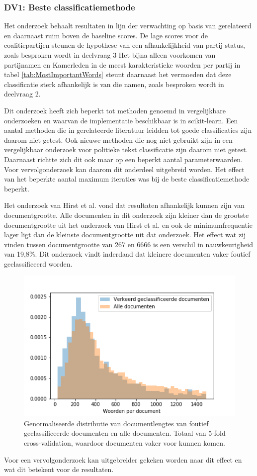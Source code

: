 \subsubsection{DV1: Beste classificatiemethode}
Het onderzoek behaalt resultaten in lijn der verwachting op basis van gerelateerd en daarnaast ruim boven de baseline scores. De lage scores voor de coalitiepartijen steunen de hypothese van een afhankelijkheid van partij-status, zoals besproken wordt in deelvraag 3 Het bijna alleen voorkomen van partijnamen en Kamerleden in de meest karakteristieke woorden per partij in tabel \ref{tab:MostImportantWords} steunt daarnaast het vermoeden dat deze classificatie sterk afhankelijk is van die namen, zoals besproken wordt in deelvraag 2.  \par
Dit onderzoek heeft zich beperkt tot methoden genoemd in vergelijkbare onderzoeken en waarvan de implementatie beschikbaar is in scikit-learn. Een aantal methoden die in gerelateerde literatuur leidden tot goede classificaties zijn daarom niet getest. Ook nieuwe methoden die nog niet gebruikt zijn in een vergelijkbaar onderzoek voor politieke tekst classificatie zijn daarom niet getest. Daarnaast richtte zich dit ook maar op een beperkt aantal parameterwaarden. Voor vervolgonderzoek kan daarom dit onderdeel uitgebreid worden. Het effect van het beperkte aantal maximum iteraties was bij de beste classificatiemethode beperkt.\par
Het onderzoek van Hirst et al. vond dat resultaten afhankelijk kunnen zijn van documentgrootte. Alle documenten in dit onderzoek zijn kleiner dan de grootste documentgrootte uit het onderzoek van Hirst et al. en ook de minimumfrequentie lager ligt dan de kleinste documentgrootte uit dat onderzoek.
Het effect wat zij vinden tussen documentgrootte van 267 en 6666 is een verschil in nauwkeurigheid van 19,8\%. Dit onderzoek vindt inderdaad dat kleinere documenten vaker foutief geclassificeerd worden.
\begin{figure}[H]
  \centering
    \includegraphics[width=0.40\paperwidth]{Verslag/Tables/misclassifiedlengths.png}
\caption{Genormaliseerde distributie van documentlengtes van foutief geclassificeerde documenten en alle documenten. Totaal van 5-fold cross-validation, waardoor documenten vaker voor kunnen komen.}
\label{fig:misclassified}
\end{figure}
Voor een vervolgonderzoek kan uitgebreider gekeken worden naar dit effect en wat dit betekent voor de resultaten.\par

